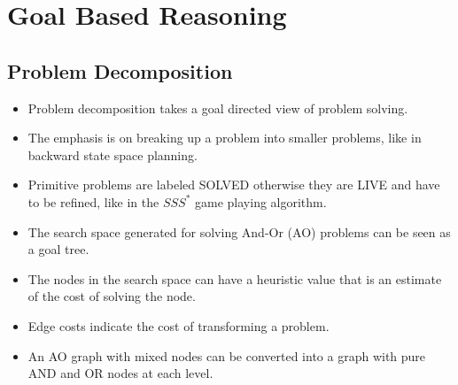 \documentclass[a4paper]{article}
\begin{document}
\section{Goal Based Reasoning}
\subsection{Problem Decomposition}
\begin{itemize}
    \item Problem decomposition takes a goal directed view of problem solving.
    \item The emphasis is on breaking up a problem into smaller problems, like in backward state space planning.
    \item Primitive problems are labeled SOLVED otherwise they are LIVE and have to be refined, like in the $SSS^*$ game playing algorithm.
    \item The search space generated for solving And-Or (AO) problems can be seen as a goal tree.
    \item The nodes in the search space can have a heuristic value that is an estimate of the cost of solving the node.
    \item Edge costs indicate the cost of transforming a problem.
    \item An AO graph with mixed nodes can be converted into a graph with pure AND and OR nodes at each level.
\end{itemize}
\end{document}
